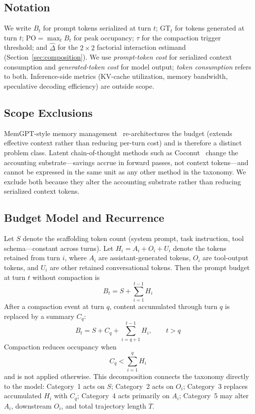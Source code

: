 \documentclass{article}
\begin{document}
\subsection{Notation}

We write $B_t$ for prompt tokens serialized at turn $t$; $\mathrm{GT}_t$ for tokens generated at turn $t$; $\mathrm{PO}=\max_t B_t$ for peak occupancy; $\tau$ for the compaction trigger threshold; and $\hat{\Delta}$ for the $2\times2$ factorial interaction estimand (Section~\ref{sec:composition}). We use \emph{prompt-token cost} for serialized context consumption and \emph{generated-token cost} for model output; \emph{token consumption} refers to both. Inference-side metrics (KV-cache utilization, memory bandwidth, speculative decoding efficiency) are outside scope.

\subsection{Scope Exclusions}

MemGPT-style memory management~\citep{memgpt2023} re-architectures the budget (extends effective context rather than reducing per-turn cost) and is therefore a distinct problem class. Latent chain-of-thought methods such as Coconut~\citep{coconut2024} change the accounting substrate---savings accrue in forward passes, not context tokens---and cannot be expressed in the same unit as any other method in the taxonomy. We exclude both because they alter the accounting substrate rather than reducing serialized context tokens.

\subsection{Budget Model and Recurrence}

Let $S$ denote the scaffolding token count (system prompt, task instruction, tool schema---constant across turns). Let $H_i = A_i + O_i + U_i$ denote the tokens retained from turn $i$, where $A_i$ are assistant-generated tokens, $O_i$ are tool-output tokens, and $U_i$ are other retained conversational tokens. Then the prompt budget at turn $t$ without compaction is
\begin{equation}
  B_t = S + \sum_{i=1}^{t-1} H_i
  \label{eq:budget}
\end{equation}
After a compaction event at turn $q$, content accumulated through turn $q$ is replaced by a summary $C_q$:
\begin{equation}
  B_t = S + C_q + \sum_{i=q+1}^{t-1} H_i, \qquad t > q
  \label{eq:budget_post}
\end{equation}
Compaction reduces occupancy when
\begin{equation}
  C_q < \sum_{i=1}^{q} H_i
  \label{eq:compaction_constraint}
\end{equation}
and is not applied otherwise. This decomposition connects the taxonomy directly to the model: Category~1 acts on $S$; Category~2 acts on $O_i$; Category~3 replaces accumulated $H_i$ with $C_q$; Category~4 acts primarily on $A_i$; Category~5 may alter $A_i$, downstream $O_i$, and total trajectory length $T$.
\end{document}
